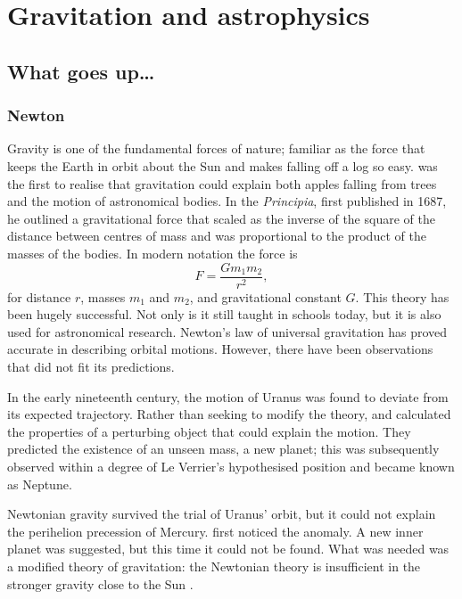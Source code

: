 \chapter{Gravitation and astrophysics}

\section{What goes up\ldots}

\subsection{Newton}

Gravity is one of the fundamental forces of nature; familiar as the force that keeps the Earth in orbit about the Sun and makes falling off a log so easy. \citet[book 3]{Newton1999} was the first to realise that gravitation could explain both apples falling from trees and the motion of astronomical bodies. In the \textit{Principia}, first published in 1687, he outlined a gravitational force that scaled as the inverse of the square of the distance between centres of mass and was proportional to the product of the masses of the bodies. In modern notation the force is
\begin{equation}
F = \frac{G m_1 m_2}{r^2},
\end{equation}
for distance $r$, masses $m_1$ and $m_2$, and gravitational constant $G$. This theory has been hugely successful. Not only is it still taught in schools today, but it is also used for astronomical research. Newton's law of universal gravitation has proved accurate in describing orbital motions. However, there have been observations that did not fit its predictions.

In the early nineteenth century, the motion of Uranus was found to deviate from its expected trajectory. Rather than seeking to modify the theory, \citet[\textit{troisi{\`e}me partie}]{LeVerrier1846} and \citet[papers 1 and 2]{Adams1896} calculated the properties of a perturbing object that could explain the motion. They predicted the existence of an unseen mass, a new planet; this was subsequently observed within a degree of Le Verrier's hypothesised position \citep[\textit{cinqui{\`e}me partie}]{LeVerrier1846} and became known as Neptune.

Newtonian gravity survived the trial of Uranus' orbit, but it could not explain the perihelion precession of Mercury. \citet[\textit{chapitre XV}, \textit{section quatri{\`e}me}]{LeVerrier1859} first noticed the anomaly. A new inner planet was suggested, but this time it could not be found. What was needed was a modified theory of gravitation: the Newtonian theory is insufficient in the stronger gravity close to the Sun \citep[document 24]{Einstein1997}.

